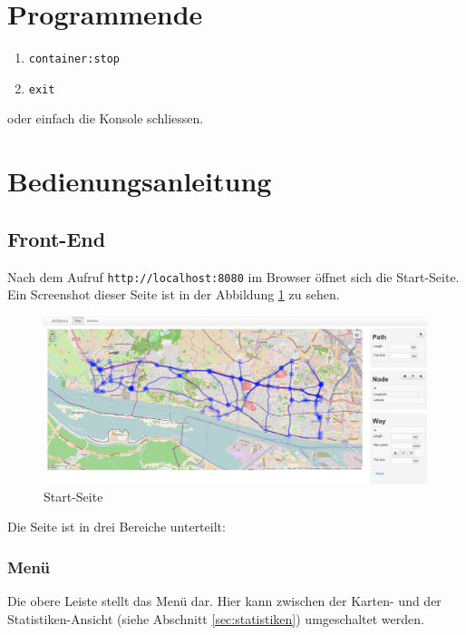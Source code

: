 \documentclass[a4paper,10pt]{scrreprt}
\begin{document}
\section{Programmende}
\label{sec:programmende}

\begin{enumerate}
  \item \texttt{container:stop}
  \item \texttt{exit}
\end{enumerate}

oder einfach die Konsole schliessen.

\section{Bedienungsanleitung}
\label{sec:bedienungsanleitung}

\subsection{Front-End}
\label{sec:front-end}

Nach dem Aufruf \texttt{http://localhost:8080} im Browser öffnet sich die Start-Seite.
Ein Screenshot dieser Seite ist in der Abbildung \ref{fig:start-seite} zu sehen.

\begin{figure}[htbp]
  \centering
  \includegraphics[width=\textwidth]{Bilder/Start-Seite.png}
  \caption{Start-Seite}
  \label{fig:start-seite}
\end{figure}

Die Seite ist in drei Bereiche unterteilt:

\subsubsection{Menü}
\label{sec:menue}

Die obere Leiste stellt das Menü dar.
Hier kann zwischen der Karten- und der Statistiken-Ansicht (siehe Abschnitt \ref{sec:statistiken}) umgeschaltet werden.
\end{document}
